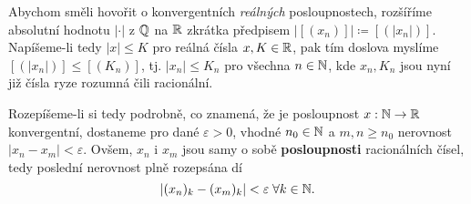 Abychom směli hovořit o konvergentních \emph{reálných} posloupnostech, rozšíříme
absolutní hodnotu $| \cdot |$ z $\mathbb{Q}$ na $\mathbb{R}$ zkrátka předpisem $|[(x_n)]|
\coloneqq [(|x_n|)]$. Napíšeme-li tedy $|x| \leq K$ pro reálná čísla $x,K \in
\mathbb{R}$, pak tím doslova myslíme $[(|x_n|)] \leq [(K_n)]$, tj. $|x_n| \leq K_n$ pro
všechna $n \in \mathbb{N}$, kde $x_n,K_n$ jsou nyní již čísla ryze rozumná čili
racionální.

Rozepíšeme-li si tedy podrobně, co znamená, že je posloupnost $x:\mathbb{N} \to \mathbb{R}$
konvergentní, dostaneme pro dané $\varepsilon>0$, vhodné $n_0 \in \mathbb{N}$ a $m,n
\geq n_0$ nerovnost $|x_n - x_m| < \varepsilon$. Ovšem, $x_n$ i $x_m$ jsou samy
o sobě \textbf{posloupnosti} racionálních čísel, tedy poslední nerovnost plně
rozepsána dí
\[
 |(x_n)_{k} - (x_m)_{k}| < \varepsilon \; \forall k \in \mathbb{N}.
\]



